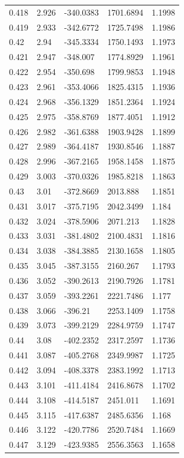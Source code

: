 \begin{tabular}{lllll}
0.418 & 2.926 & -340.0383 & 1701.6894 & 1.1998 \\
0.419 & 2.933 & -342.6772 & 1725.7498 & 1.1986 \\
0.42 & 2.94 & -345.3334 & 1750.1493 & 1.1973 \\
0.421 & 2.947 & -348.007 & 1774.8929 & 1.1961 \\
0.422 & 2.954 & -350.698 & 1799.9853 & 1.1948 \\
0.423 & 2.961 & -353.4066 & 1825.4315 & 1.1936 \\
0.424 & 2.968 & -356.1329 & 1851.2364 & 1.1924 \\
0.425 & 2.975 & -358.8769 & 1877.4051 & 1.1912 \\
0.426 & 2.982 & -361.6388 & 1903.9428 & 1.1899 \\
0.427 & 2.989 & -364.4187 & 1930.8546 & 1.1887 \\
0.428 & 2.996 & -367.2165 & 1958.1458 & 1.1875 \\
0.429 & 3.003 & -370.0326 & 1985.8218 & 1.1863 \\
0.43 & 3.01 & -372.8669 & 2013.888 & 1.1851 \\
0.431 & 3.017 & -375.7195 & 2042.3499 & 1.184 \\
0.432 & 3.024 & -378.5906 & 2071.213 & 1.1828 \\
0.433 & 3.031 & -381.4802 & 2100.4831 & 1.1816 \\
0.434 & 3.038 & -384.3885 & 2130.1658 & 1.1805 \\
0.435 & 3.045 & -387.3155 & 2160.267 & 1.1793 \\
0.436 & 3.052 & -390.2613 & 2190.7926 & 1.1781 \\
0.437 & 3.059 & -393.2261 & 2221.7486 & 1.177 \\
0.438 & 3.066 & -396.21 & 2253.1409 & 1.1758 \\
0.439 & 3.073 & -399.2129 & 2284.9759 & 1.1747 \\
0.44 & 3.08 & -402.2352 & 2317.2597 & 1.1736 \\
0.441 & 3.087 & -405.2768 & 2349.9987 & 1.1725 \\
0.442 & 3.094 & -408.3378 & 2383.1992 & 1.1713 \\
0.443 & 3.101 & -411.4184 & 2416.8678 & 1.1702 \\
0.444 & 3.108 & -414.5187 & 2451.011 & 1.1691 \\
0.445 & 3.115 & -417.6387 & 2485.6356 & 1.168 \\
0.446 & 3.122 & -420.7786 & 2520.7484 & 1.1669 \\
0.447 & 3.129 & -423.9385 & 2556.3563 & 1.1658 \\

\end{tabular}
